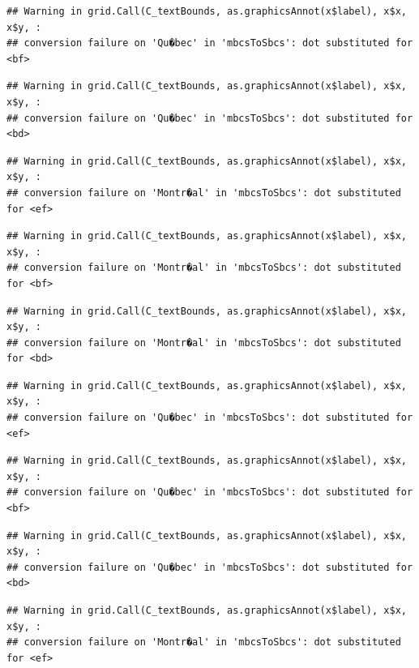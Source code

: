 \documentclass[]{article}
\begin{document}
\begin{verbatim}
## Warning in grid.Call(C_textBounds, as.graphicsAnnot(x$label), x$x, x$y, :
## conversion failure on 'Qu�bec' in 'mbcsToSbcs': dot substituted for <bf>
\end{verbatim}

\begin{verbatim}
## Warning in grid.Call(C_textBounds, as.graphicsAnnot(x$label), x$x, x$y, :
## conversion failure on 'Qu�bec' in 'mbcsToSbcs': dot substituted for <bd>
\end{verbatim}

\begin{verbatim}
## Warning in grid.Call(C_textBounds, as.graphicsAnnot(x$label), x$x, x$y, :
## conversion failure on 'Montr�al' in 'mbcsToSbcs': dot substituted for <ef>
\end{verbatim}

\begin{verbatim}
## Warning in grid.Call(C_textBounds, as.graphicsAnnot(x$label), x$x, x$y, :
## conversion failure on 'Montr�al' in 'mbcsToSbcs': dot substituted for <bf>
\end{verbatim}

\begin{verbatim}
## Warning in grid.Call(C_textBounds, as.graphicsAnnot(x$label), x$x, x$y, :
## conversion failure on 'Montr�al' in 'mbcsToSbcs': dot substituted for <bd>
\end{verbatim}

\begin{verbatim}
## Warning in grid.Call(C_textBounds, as.graphicsAnnot(x$label), x$x, x$y, :
## conversion failure on 'Qu�bec' in 'mbcsToSbcs': dot substituted for <ef>
\end{verbatim}

\begin{verbatim}
## Warning in grid.Call(C_textBounds, as.graphicsAnnot(x$label), x$x, x$y, :
## conversion failure on 'Qu�bec' in 'mbcsToSbcs': dot substituted for <bf>
\end{verbatim}

\begin{verbatim}
## Warning in grid.Call(C_textBounds, as.graphicsAnnot(x$label), x$x, x$y, :
## conversion failure on 'Qu�bec' in 'mbcsToSbcs': dot substituted for <bd>
\end{verbatim}

\begin{verbatim}
## Warning in grid.Call(C_textBounds, as.graphicsAnnot(x$label), x$x, x$y, :
## conversion failure on 'Montr�al' in 'mbcsToSbcs': dot substituted for <ef>
\end{verbatim}
\end{document}
